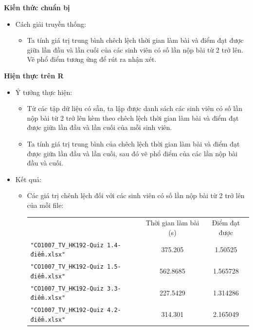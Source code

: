 \documentclass[a4paper]{article}
\theoremstyle{definition}
\begin{document}
\begin{enumerate}[a)]
    \bf Kiến thức chuẩn bị\normalfont
    \begin{itemize}
        \item Cách giải truyền thống:
        \begin{itemize}
            \item Ta tính giá trị trung bình chêch lệch thời gian làm bài và điểm đạt được giữa lần đầu và lần cuối của các sinh viên có số lần nộp bài từ 2 trở lên. Vẽ phổ điểm tương ứng để rút ra nhận xét.
        \end{itemize}
    \end{itemize}
    \bf Hiện thực trên R\normalfont
    \begin{itemize}
        \item Ý tưởng thực hiện:
        \begin{itemize}
            \item Từ các tập dữ liệu có sẵn, ta lập được danh sách các sinh viên có số lần nộp bài từ 2 trở lên kèm theo chêch lệch thời gian làm bài và điểm đạt được giữa lần đầu và lần cuối của mỗi sinh viên.
            \item Ta tính giá trị trung bình của chêch lệch thời gian làm bài và điểm đạt được giữa lần đầu và lần cuối, sau đó vẽ phổ điểm của các lần nộp bài đầu và cuối.
        \end{itemize}
        \item Kết quả:
        \begin{itemize}
            \item Các giá trị chênh lệch đối với các sinh viên có số lần nộp bài từ 2 trở lên của mỗi file:
            \begin{center}
                \begin{tabular}{l c c}
                     & Thời gian làm bài (s) & Điểm đạt được\\
                     \texttt{"CO1007\_TV\_HK192-Quiz 1.4-điểm.xlsx"} & 375.205 & 1.50525\\ 
                     \texttt{"CO1007\_TV\_HK192-Quiz 1.5-điểm.xlsx"} & 562.8685 & 1.565728\\ 
                     \texttt{"CO1007\_TV\_HK192-Quiz 3.3-điểm.xlsx"} & 227.5429 & 1.314286\\ 
                     \texttt{"CO1007\_TV\_HK192-Quiz 4.2-điểm.xlsx"} & 314.301 & 2.165049\\ 
                \end{tabular}
            \end{center}
        \end{itemize}

\end{itemize}
\end{enumerate}
\end{document}
